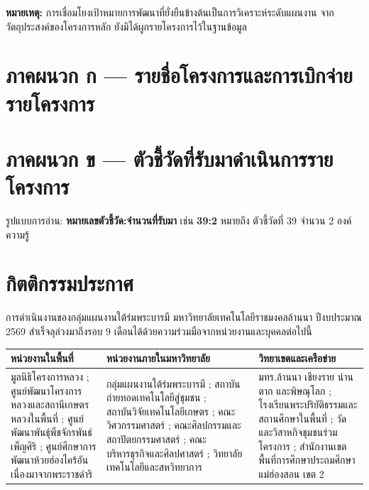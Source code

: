 \documentclass[12pt,a4paper]{article}
\begin{document}
{\footnotesize \textbf{หมายเหตุ:} การเชื่อมโยงเป้าหมายการพัฒนาที่ยั่งยืนข้างต้นเป็นการวิเคราะห์ระดับแผนงาน
จากวัตถุประสงค์ของโครงการหลัก ยังมิได้ผูกรายโครงการไว้ในฐานข้อมูล}

\clearpage
\section*{ภาคผนวก ก --- รายชื่อโครงการและการเบิกจ่ายรายโครงการ}
\markboth{}{}



\clearpage
\section*{ภาคผนวก ข --- ตัวชี้วัดที่รับมาดำเนินการรายโครงการ}

{\footnotesize รูปแบบการอ่าน: \textbf{หมายเลขตัวชี้วัด:จำนวนที่รับมา} เช่น \textbf{39:2} หมายถึง ตัวชี้วัดที่ 39 จำนวน 2 องค์ความรู้\par\vspace{4pt}}



\clearpage
\section*{กิตติกรรมประกาศ}

การดำเนินงานของกลุ่มแผนงานใต้ร่มพระบารมี มหาวิทยาลัยเทคโนโลยีราชมงคลล้านนา ปีงบประมาณ 2569
สำเร็จลุล่วงมาถึงรอบ 9 เดือนได้ด้วยความร่วมมือจากหน่วยงานและบุคคลต่อไปนี้

\begin{center}\small
\setlength{\tabcolsep}{8pt}\renewcommand{\arraystretch}{1.3}
\begin{tabular}{p{4.7cm}p{4.7cm}p{4.7cm}}
\toprule
\rowcolor{rpfnavy!12}
\textbf{หน่วยงานในพื้นที่} & \textbf{หน่วยงานภายในมหาวิทยาลัย} & \textbf{วิทยาเขตและเครือข่าย}\\
\midrule
มูลนิธิโครงการหลวง ;
ศูนย์พัฒนาโครงการหลวงและสถานีเกษตรหลวงในพื้นที่ ;
ศูนย์พัฒนาพันธุ์พืชจักรพันธ์เพ็ญศิริ ;
ศูนย์ศึกษาการพัฒนาห้วยฮ่องไคร้อันเนื่องมาจากพระราชดำริ
&
กลุ่มแผนงานใต้ร่มพระบารมี ;
สถาบันถ่ายทอดเทคโนโลยีสู่ชุมชน ;
สถาบันวิจัยเทคโนโลยีเกษตร ;
คณะวิศวกรรมศาสตร์ ;
คณะศิลปกรรมและสถาปัตยกรรมศาสตร์ ;
คณะบริหารธุรกิจและศิลปศาสตร์ ;
วิทยาลัยเทคโนโลยีและสหวิทยาการ
&
มทร.ล้านนา เชียงราย น่าน ตาก และพิษณุโลก ;
โรงเรียนพระปริยัติธรรมและสถานศึกษาในพื้นที่ ;
วัดและวิสาหกิจชุมชนร่วมโครงการ ;
สำนักงานเขตพื้นที่การศึกษาประถมศึกษาแม่ฮ่องสอน เขต 2
\\
\bottomrule
\end{tabular}
\end{center}
\end{document}
